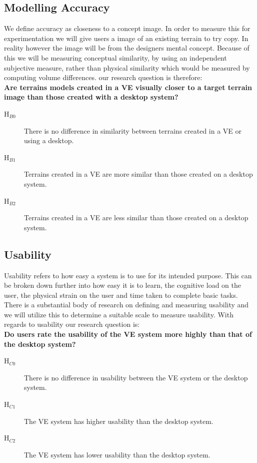\documentclass{sig-alternate-05-2015}
\begin{document}
\subsection{Modelling Accuracy}
We define accuracy as closeness to a concept image. In order to measure this for experimentation we will give users a image of an existing terrain to try copy. In reality however the image will be from the designers mental concept. Because of this we will be measuring conceptual similarity, by using an independent subjective measure, rather than physical similarity which would be measured by computing volume differences. our research question is therefore:\\
\textbf{Are terrains models created in a VE visually closer to a target terrain image than those created with a desktop system?}\\
\begin{description}
	\item [H$_{B0}$] There is no difference in similarity between terrains created in a VE or using a desktop.
	\item [H$_{B1}$] Terrains created in a VE are more similar than those created on a desktop system.
	\item [H$_{B2}$] Terrains created in a VE are less similar than those created on a desktop system.
\end{description}
\subsection{Usability}
Usability refers to how easy a system is to use for its intended purpose. This can be broken down further into how easy it is to learn, the cognitive load on the user, the physical strain on the user and time taken to complete basic tasks. There is a substantial body of research on defining and measuring usability and we will utilize this to determine a suitable scale to measure usability. With regards to usability our research question is:\\
\textbf{Do users rate the usability of the VE system more highly than that of the desktop system?}\\ 
\begin{description}
	\item [H$_{C0}$] There is no difference in usability between the VE system or the desktop system.
	\item [H$_{C1}$] The VE system has higher usability than the desktop system.
	\item [H$_{C2}$] The VE system has lower usability than the desktop system.
\end{description}
\end{document}
